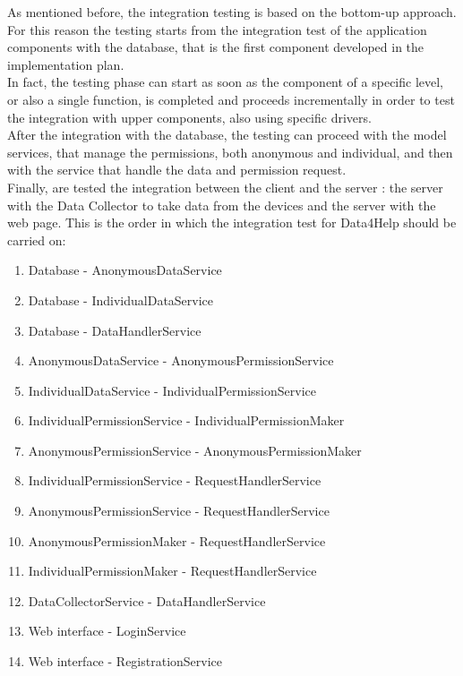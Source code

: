 \documentclass[a4paper]{article}
\begin{document}
\noindent As mentioned before, the integration testing is based on the bottom-up approach. For this reason the testing starts from the integration test of the application components with the database, that is the first component developed in the implementation plan.\\
In fact, the testing phase can start as soon as the component of a specific level, or also a single function, is completed and proceeds incrementally in order to test the integration with upper components, also using specific drivers.\\
After the integration with the database, the testing can proceed with the model services, that manage the permissions, both anonymous and individual, and then with the service that handle the data and permission request.\\ 
Finally, are tested the integration between the client and the server : the server with the Data Collector to take data from the devices and the server with the web page.
\newline \newline This is the order in which the integration test for Data4Help should be carried on:


\begin{enumerate}[label*=\bf{\arabic*} . ]
    \item Database - AnonymousDataService
    \item Database - IndividualDataService
    \item Database - DataHandlerService
    \item AnonymousDataService - AnonymousPermissionService
    \item IndividualDataService - IndividualPermissionService
    \item IndividualPermissionService - IndividualPermissionMaker
    \item AnonymousPermissionService - AnonymousPermissionMaker
    \item IndividualPermissionService - RequestHandlerService
    \item AnonymousPermissionService - RequestHandlerService
    \item AnonymousPermissionMaker - RequestHandlerService
    \item IndividualPermissionMaker - RequestHandlerService
    \item DataCollectorService - DataHandlerService
    \item Web interface - LoginService
    \item Web interface - RegistrationService
\end{enumerate}
\end{document}
